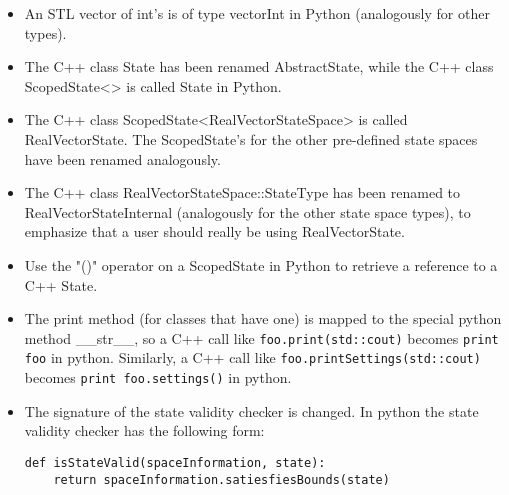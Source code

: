 \begin {itemize}
\item An STL vector of int's is of type vectorInt in Python (analogously for 
other types).
\item The C++ class State has been renamed AbstractState, while the C++ class 
ScopedState<> is called State in Python.
\item The C++ class ScopedState<RealVectorStateSpace> is called RealVectorState. 
The ScopedState's for the other pre-defined state spaces have been renamed 
analogously.
\item The C++ class RealVectorStateSpace::StateType has been renamed to 
RealVectorStateInternal (analogously for the other state space types), to 
emphasize that a user should really be using RealVectorState.
\item Use the "()" operator on a ScopedState in Python to retrieve a reference
to a C++ State.
\item The print method (for classes that have one) is mapped to the special 
python method \_\_str\_\_, so a C++ call like {\tt foo.print(std::cout)} becomes
{\tt print foo} in python. Similarly, a C++ call like 
{\tt foo.printSettings(std::cout)} becomes {\tt print foo.settings()} in python.
\item The signature of the state validity checker is changed. In python the 
state validity checker has the following form:
\begin {verbatim}
def isStateValid(spaceInformation, state):
    return spaceInformation.satiesfiesBounds(state)
\end {verbatim}

\end {itemize}

